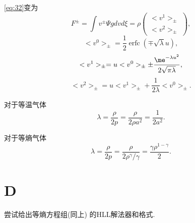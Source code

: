 \documentclass[12pt]{article}
\begin{document}
\cref{eq:32}变为
\begin{equation}
	F^{\pm}=\int v^{\pm} \Psi g d v d \xi=\rho\left(\begin{array}{c}
			<v^{1}>_{\pm} \\
			<v^{2}>_{\pm}
		\end{array}\right),
\end{equation}
\begin{equation}
	<v^{0}>_{\pm}=\frac{1}{2} \operatorname{erfc}(\mp \sqrt{\lambda} u),
\end{equation}
\begin{equation}
	<v^{1}>_{\pm}=u<v^{0}>_{\pm} \pm \frac{\me^{-\lambda u^{2}}}{2 \sqrt{\pi \lambda}},
\end{equation}
\begin{equation}
	<v^{2}>_{\pm}=u<v^{1}>_{\pm}+\frac{1}{2 \lambda}<v^{0}>_{\pm}.
\end{equation}

对于等温气体
\begin{equation}
	\lambda = \frac{\rho}{2p} = \frac{\rho}{2\rho a^2} = \frac{1}{2a^2}.
\end{equation}

对于等熵气体
\begin{equation}
	\lambda = \frac{\rho}{2p} = \frac{\rho}{2\rho^\gamma/\gamma} = \frac{\gamma \rho^{1-\gamma}}{2}.
\end{equation}



\section{D}

尝试给出等熵方程组(同上) 的HLL解法器和格式.
\end{document}
